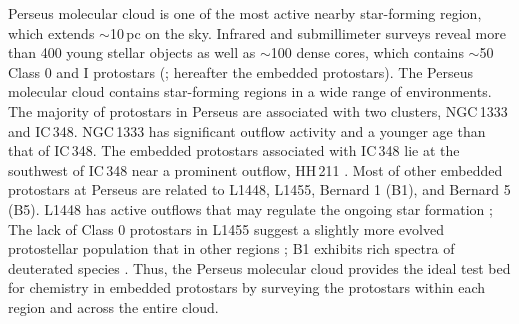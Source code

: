 \documentclass[twocolumn]{aastex62}
\begin{document}
Perseus molecular cloud is one of the most active nearby star-forming region, which extends $\sim$10\,pc on the sky.  Infrared and submillimeter surveys reveal more than 400 young stellar objects as well as $\sim$100 dense cores, which contains $\sim$50 Class 0 and I protostars (\citealt{2005AA...440..151H,2008ApJ...683..822J,2013AJ....145...94D}; hereafter the embedded protostars).  The Perseus molecular cloud contains star-forming regions in a wide range of environments.  The majority of protostars in Perseus are associated with two clusters, NGC\,1333 and IC\,348.  NGC\,1333 has significant outflow activity \citep{2013ApJ...774...22P} and a younger age than that of IC\,348.  The embedded protostars associated with IC\,348 lie at the southwest of IC\,348 near a prominent outflow, HH\,211 \citep[e.g., ][]{2009ApJ...699.1584L}.  Most of other embedded protostars at Perseus are related to L1448, L1455, Bernard 1 (B1), and Bernard 5 (B5).  L1448 has active outflows that may regulate the ongoing star formation \citep{2010MNRAS.408.1516C}; The lack of Class 0 protostars in L1455 suggest a slightly more evolved protostellar population that in other regions \citep{2007AA...468.1009H}; B1 exhibits rich spectra of deuterated species \citep{2005AA...438..585R,2005ApJ...620..308M}.  Thus, the Perseus molecular cloud provides the ideal test bed for chemistry in embedded protostars by surveying the protostars within each region and across the entire cloud.
\end{document}

